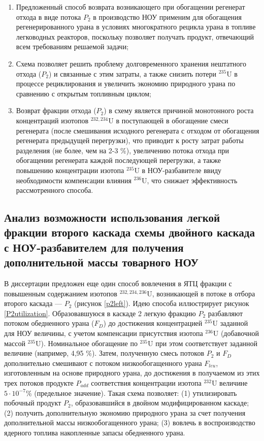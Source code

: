 \begin{enumerate}
    \item Предложенный способ возврата возникающего при обогащении регенерат отхода в виде потока $P_2$ в производство НОУ применим для обогащения регенерированного урана в условиях многократного рецикла урана в топливе легководных реакторов, поскольку позволяет получать продукт, отвечающий всем требованиям решаемой задачи;
    \item Схема позволяет решить проблему долговременного хранения нештатного отхода ($P_2$) и связанные с этим затраты, а также снизить потери $^{235}$U в процессе рециклирования и увеличить экономию природного урана по сравнению с открытым топливным циклом;
    \item Возврат фракции отхода ($P_2$) в схему является причиной монотонного роста концентраций изотопов $^{232,234}$U в поступающей в обогащение смеси регенерата (после смешивания исходного регенерата с отходом от обогащения регенерата предыдущей перегрузки), что приводит к росту затрат работы разделения (не более, чем на 2-3 \%), увеличению потока отхода при обогащении регенерата каждой последующей перегрузки, а также повышению концентрации изотопа $^{235}$U в НОУ-разбавителе ввиду необходимости компенсации влияния $^{236}$U, что снижает эффективность рассмотренного способа.
\end{enumerate}


\subsection{Анализ возможности использования легкой фракции второго каскада схемы двойного каскада с НОУ-разбавителем для получения дополнительной массы товарного НОУ}\label{indep_p2}

В диссертации предложен еще один способ вовлечения в ЯТЦ фракции с повышенным содержанием изотопов $^{232,234,236}$U, возникающей в потоке в отбора второго каскада --- $P_2$ (рисунок \ref{p2left}). Идею способа иллюстрирует рисунок \ref{P2utilization}. Образовавшуюся в каскаде 2 легкую фракцию $P_2$ разбавляют потоком обедненного урана ($F_D$) до достижения концентрацией $^{235}$U заданной для НОУ величины, с учетом компенсации присутствия изотопа $^{236}$U (добавочной массой $^{235}$U). Номинальное обогащение по $^{235}$U при этом соответствует заданной величине (например, 4,95 \%). Затем, полученную смесь потоков $P_2$ и $F_D$ дополнительно смешивают с потоком низкообогащенного урана $F_{leu}$, изготовленным на основе природного урана, до достижения в получаемом из этих трех потоков продукте $P_{add}$ соответствия концентрации изотопа $^{232}$U величине $5\cdot10^{-7}$\% (предельное значение). Такая схема позволяет: (1) утилизировать побочный продукт $P_2$, образовавшийся в двойном модифицированном каскаде; (2) получить дополнительную экономию природного урана за счет получения дополнительной массы низкообогащенного урана; (3) вовлечь в воспроизводство ядерного топлива накопленные запасы обедненного урана. 

